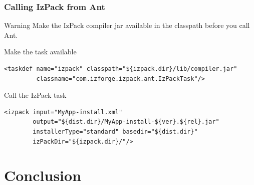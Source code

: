 \documentclass[compress,10pt]{beamer}
\begin{document}
\begin{frame}[containsverbatim]

\frametitle{Calling IzPack from Ant}

\begin{alertblock}{Warning}
Make the IzPack compiler jar available in the classpath before you call Ant.
\end{alertblock}

\begin{block}{Make the task available}
\tiny
\begin{verbatim}
<taskdef name="izpack" classpath="${izpack.dir}/lib/compiler.jar"
         classname="com.izforge.izpack.ant.IzPackTask"/>
\end{verbatim}
\end{block}

\begin{block}{Call the IzPack task}
\tiny
\begin{verbatim}
<izpack input="MyApp-install.xml"
        output="${dist.dir}/MyApp-install-${ver}.${rel}.jar"
        installerType="standard" basedir="${dist.dir}"
        izPackDir="${izpack.dir}/"/>
\end{verbatim}
\end{block}

\end{frame}


\section{Conclusion}
\end{document}
